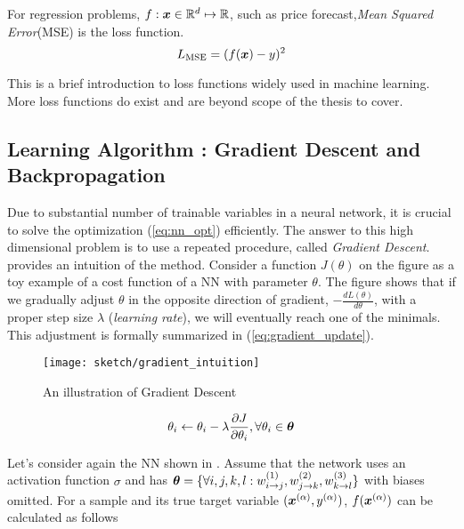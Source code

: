 For regression problems, $ f : \boldsymbol{x} \in \mathbb{R}^d  \mapsto \mathbb{R}$, such as price forecast,\textit{Mean Squared Error}(MSE) is the loss function.
$$
L_{\text{MSE}} = (f(\boldsymbol{x}) - y)^2
$$

This is a brief introduction to loss functions widely used in machine learning. More loss functions do exist and are beyond scope of the thesis to cover.

\subsection{Learning Algorithm : Gradient Descent and Backpropagation}
Due to substantial number of trainable variables in a neural network, it is crucial to solve the optimization (\ref{eq:nn_opt}) efficiently. The answer to  this high dimensional problem is to use a repeated procedure, called \textit{Gradient Descent}.  \addfigure{\ref{fig:gradent_descent_toy}} provides an intuition of the method. Consider a  function $J(\theta)$ on the figure as a toy example of a cost function of a NN with parameter $\theta$. The figure shows that if we gradually adjust $\theta$ in the opposite direction of gradient, $	-\frac{d L(\theta)}{d \theta}$,  with a proper step size $\lambda$ (\textit{learning rate}), we will eventually reach one of the minimals. This adjustment  is formally summarized in (\ref{eq:gradient_update}).


%

\begin{figure}[!hbt]
    \begin{center}
		\texttt{[image: sketch/gradient\_intuition]}
		\caption[]{An illustration of Gradient Descent}
		\label{fig:gradent_descent_toy}
	\end{center}
\end{figure}

\begin{align}
 \theta_i \leftarrow \theta_i - \lambda  \frac{\partial J }{\partial \theta_i}, \forall \theta_i \in \boldsymbol{\theta}
\label{eq:gradient_update}
\end{align}


Let's consider again the NN shown in \addfigure{\ref{fig:nn_typical_structure}}. Assume that the network uses an activation function $\sigma$ and has $\boldsymbol{\theta} = \{ \forall i,j,k,l : w^{(1)}_{i \rightarrow j}, w^{(2)}_{j \rightarrow k}, w^{(3)}_{k \rightarrow l}  \}$ with biases omitted. For a sample and its true target variable $(\xa, \ya)$, $f(\xa )$ can be  calculated as follows

